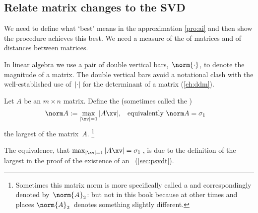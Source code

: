 \subsection{Relate matrix changes to the SVD}
\label{sec:rmmsvd}


We need to define what `best' means in the approximation \cref{pro:ai} and then show the procedure achieves this best.
We need a measure of the  of matrices and of distances between matrices.

In linear algebra we use a pair of double vertical bars,~\(\norm{\cdot}\), to  denote the magnitude of a matrix. 
The double vertical bars avoid a notational clash with the well-established use of~\(|\cdot|\) for the determinant of a matrix (\cref{ch:ddm}).

\begin{definition} \label{def:norm} 
Let \(A\) be an \(m\times n\) matrix.  
Define the  (sometimes called the )
\begin{align}&
\norm A:=\max_{|\xv|=1}|A\xv|, 
&&\text{equivalently }\norm A=\sigma_1
\end{align}
the largest  of the matrix~\(A\).%
\footnote{Sometimes this matrix norm is more specifically called a  and correspondingly denoted by~\(\norm{A}_2\): but not in this book because at other times and places \(\norm{A}_2\)~denotes something slightly different.}
\end{definition}
The equivalence, that \(\max_{|\xv|=1}|A\xv|=\sigma_1\)\,, is due to the definition of the largest  in the proof of the existence of an \svd\ (\cref{sec:psvdt}).



